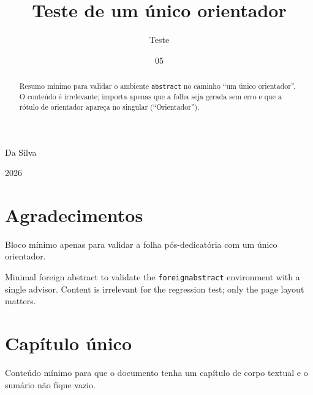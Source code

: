 \documentclass[dsc]{ufrj}
\begin{document}
  \title{Teste de um único orientador}
  \author{Teste}{Da Silva}


  \date{05}{2026}


  \maketitle

  \frontmatter
  \dedication{Dedico a quem revisar este teste.}

  \chapter*{Agradecimentos}
  Bloco mínimo apenas para validar a folha pós-dedicatória com um
  único orientador.

  \begin{abstract}
  Resumo mínimo para validar o ambiente \texttt{abstract} no caminho
  ``um único orientador''. O conteúdo é irrelevante; importa apenas
  que a folha seja gerada sem erro e que a rótulo de orientador apareça
  no singular (``Orientador'').
  \end{abstract}

  \begin{foreignabstract}
  Minimal foreign abstract to validate the \texttt{foreignabstract}
  environment with a single advisor. Content is irrelevant for the
  regression test; only the page layout matters.
  \end{foreignabstract}

  \tableofcontents

  \mainmatter
  \chapter{Capítulo único}
  Conteúdo mínimo para que o documento tenha um capítulo de corpo
  textual e o sumário não fique vazio.

  \ufrjfinalpage%
\end{document}

